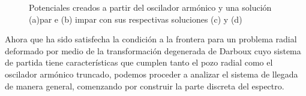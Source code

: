 \begin{figure}
	\centering
	\hfill%
	\hfill%
	\hfill%
	\caption{\label{Fig_POAEO} 
		Potenciales creados a partir del oscilador armónico y una solución (a)par e (b) impar con sus respectivas soluciones (c) y (d)}
\end{figure} 

Ahora que ha sido satisfecha la condición a la frontera para un problema radial deformado por medio de la transformación degenerada de Darboux cuyo sistema de partida tiene características que cumplen tanto el pozo radial como el oscilador armónico truncado, podemos proceder a analizar el sistema de llegada de manera general, comenzando por construir la parte discreta del espectro.



